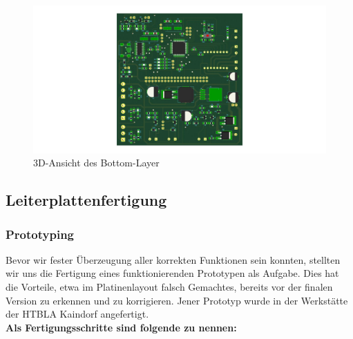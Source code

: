 \begin{figure}[hb]
    \includegraphics[scale=0.24]{fig/elektro/PlatineBot.jpg}
    \caption{3D-Ansicht des Bottom-Layer}
\end{figure}

\newpage
\subsection{Leiterplattenfertigung}

\subsubsection{Prototyping}

Bevor wir fester Überzeugung aller korrekten Funktionen sein konnten, stellten wir uns die Fertigung eines funktionierenden Prototypen als Aufgabe.
Dies hat die Vorteile, etwa im Platinenlayout falsch Gemachtes, bereits vor der finalen Version zu erkennen und zu korrigieren.
Jener Prototyp wurde in der Werkstätte der \acs{HTBLA} Kaindorf angefertigt. \\

\textbf{Als Fertigungsschritte sind folgende zu nennen:}

